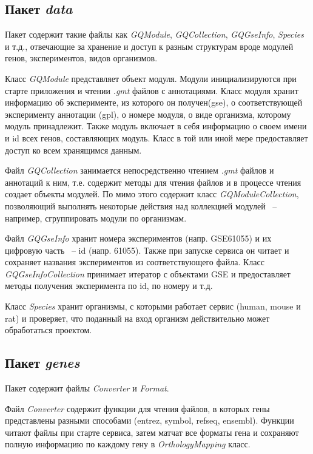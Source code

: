 \documentclass[times,specification,annotation]{itmo-student-thesis}
\begin{document}
\subsection{Пакет \textit{data}}
Пакет содержит такие файлы как \textit{GQModule}, \textit{GQCollection}, \textit{GQGseInfo}, \textit{Species} и т.д., отвечающие за хранение и доступ к разным структурам вроде модулей генов, экспериментов, видов организмов. 

Класс \textit{GQModule} представляет объект модуля. Модули инициализируются при старте приложения и чтении \textit{.gmt} файлов с аннотациями. Класс модуля хранит информацию об эксперименте, из которого он получен(gse), о соответствующей эксперименту аннотации (gpl), о номере модуля, о виде организма, которому модуль принадлежит. Также модуль включает в себя информацию о своем имени и id всех генов, составляющих модуль. Класс в той или иной мере предоставляет доступ ко всем хранящимся данным.

Файл \textit{GQCollection} занимается непосредственно чтением \textit{.gmt} файлов и аннотаций к ним, т.е. содержит методы для чтения файлов и в процессе чтения создает объекты модулей. По мимо этого содержит класс \textit{GQModuleCollection}, позволяющий выполнять некоторые действия над коллекцией модулей ~-- например, сгруппировать модули по организмам.

Файл \textit{GQGseInfo} хранит номера экспериментов (напр. GSE61055) и их цифровую часть ~-- id (напр. 61055). Также при запуске сервиса он читает и сохраняет названия экспериментов из соответствующего файла. Класс \textit{GQGseInfoCollection} принимает итератор с объектами GSE и предоставляет методы получения эксперимента по id, по номеру и т.д.

Класс \textit{Species} хранит организмы, с которыми работает сервис (human, mouse и rat) и проверяет, что поданный на вход организм действительно может обработаться проектом. 


\subsection{Пакет \textit{genes}}
Пакет содержит файлы \textit{Converter} и \textit{Format}.

Файл \textit{Converter} содержит функции для чтения файлов, в которых гены представлены разными способами (entrez, symbol, refseq, ensembl). Функции читают файлы при старте сервиса, затем матчат все форматы гена и сохраняют полную информацию по каждому гену в \textit{OrthologyMapping} класс.
\end{document}
